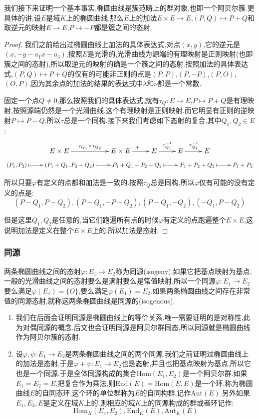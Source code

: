 我们接下来证明一个基本事实,椭圆曲线是簇范畴上的群对象,也即一个阿贝尔簇.更具体的讲,设$E$是域$K$上的椭圆曲线,那么$E$上的加法$E\times E\to E$,$(P,Q)\mapsto P+Q$和取逆元的映射$E\to E$,$P\mapsto -P$都是簇之间的态射.
\begin{proof}
	
	我们之前给出过椭圆曲线上加法的具体表达式,对点$(x,y)$,它的逆元是$(x,-y-a_1x-a_3)$,按照$E$是光滑的,光滑曲线为源端的有理映射是正则映射(也即簇之间的态射),所以取逆元的映射的确是一个簇之间的态射.按照加法的具体表达式,$(P,Q)\mapsto P+Q$的仅有的可能非正则的点是$(P,P)$,$(P,-P)$,$(P,O)$,$(O,P)$,因为其余点的加法的结果的表达式中$\lambda$和$\nu$都是一个常数.
	
	\qquad
	
	固定一个点$Q\not=0$,那么按照我们的具体表达式,就有$\tau_Q:E\to E$,$P\mapsto P+Q$是有理映射,按照源端仍然是一个光滑曲线,这个有理映射是正则映射.而它明显有正则的逆映射$P\mapsto P-Q$,所以$\tau$总是一个同构.接下来我们考虑如下态射的复合,其中$Q_1,Q_2\in E$:
	$$\xymatrix{E\times E\ar[rr]^{\tau_{Q_1}\times\tau_{Q_2}}&&E\times E\ar[r]^+&E\ar[r]^{\tau_{Q_1}^{-1}}&E\ar[r]^{\tau_{Q_2}^{-1}}&E}$$
	$$\xymatrix{(P_1,P_2)\ar@{|->}[r]&(P_1+Q_1,P_2+Q_2)\ar@{|->}[r]&P_1+Q_1+P_2+Q_2\ar@{|->}[r]&P_1+P_2+Q_2\ar@{|->}[r]&P_1+P_2}$$
	
	所以只要$\varphi$有定义的点都和加法是一致的.按照$\tau_Q$总是同构,所以$\varphi$仅有可能的没有定义的点是:
	$$(P-Q_1,P-Q_2),(P-Q_1,-P-Q_2),(P-Q_1,-Q_2),(-Q_1,P-Q_2)$$
	
	但是这里$Q_1,Q_2$是任意的,当它们跑遍所有点的时候$\varphi$有定义的点跑遍整个$E\times E$,这说明加法是定义在整个$E\times E$上的,所以加法是态射.
\end{proof}
\subsubsection{同源}

两条椭圆曲线之间的态射$\varphi:E_1\to E_2$称为同源(isogeny),如果它把基点映射为基点.一般的光滑曲线之间的态射要么是满射要么是常值映射,所以一个同源$\varphi:E_1\to E_2$要么满足$\varphi(E_1)=\{O\}$,要么满足$\varphi(E_1)=E_2$.如果两条椭圆曲线之间存在非常值的同源态射,就称这两条椭圆曲线是同源的(isogenous).
\begin{enumerate}
	\item 我们在后面会证明同源是椭圆曲线上的等价关系,唯一需要证明的是对称性,此为对偶同源的概念.后文也会证明同源是阿贝尔群同态,所以同源就是椭圆曲线作为阿贝尔簇的态射.
	\item 设$\varphi,\psi:E_1\to E_2$是两条椭圆曲线之间的两个同源,我们之前证明过椭圆曲线上的加法是态射,于是$\varphi+\psi:E_1\to E_2$也是态射,并且也把基点映射为基点,所以它也是一个同源.于是全体同源构成的集合$\mathrm{Hom}(E_1,E_2)$是一个阿贝尔群.如果$E_1=E_2=E$,把复合作为乘法,则$\mathrm{End}(E)=\mathrm{Hom}(E,E)$是一个环,称为椭圆曲线$E$的自同态环,这个环的单位群称为$E$的自同构群,记作$\mathrm{Aut}(E)$.另外如果$E_1,E_2,E$是定义在域$K$上的,则相应的域$K$上的同源构成的群或者环记作:
	$$\mathrm{Hom}_K(E_1,E_2),\mathrm{End}_K(E),\mathrm{Aut}_K(E)$$
\end{enumerate}

